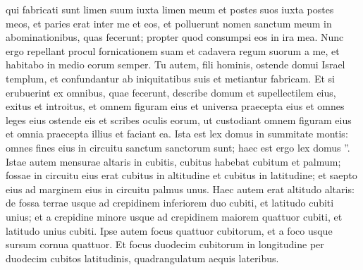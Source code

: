 \begin{biblechapter}
\begin{biblechapter}
\begin{biblechapter}
\begin{biblechapter}
\begin{biblechapter}
\begin{biblechapter}
\begin{biblechapter}
\begin{biblechapter}
\begin{biblechapter}
\begin{biblechapter}
\begin{biblechapter}
\begin{biblechapter}
\begin{biblechapter}
\begin{biblechapter}
\begin{biblechapter}
\begin{biblechapter}
\begin{biblechapter}
\begin{biblechapter}
\begin{biblechapter}
\begin{biblechapter}
\begin{biblechapter}
\begin{biblechapter}
\begin{biblechapter}
\begin{biblechapter}
\begin{biblechapter}
\begin{biblechapter}
\begin{biblechapter}
\begin{biblechapter}
\begin{biblechapter}
\begin{biblechapter}
\begin{biblechapter}
\begin{biblechapter}
\begin{biblechapter}
\begin{biblechapter}
\begin{biblechapter}
\begin{biblechapter}
\begin{biblechapter}
\begin{biblechapter}
\begin{biblechapter}
\begin{biblechapter}
\begin{biblechapter}
\begin{biblechapter}
\begin{biblechapter}
 \verse qui fabricati sunt limen suum iuxta limen meum et postes suos iuxta postes meos, et paries erat inter me et eos, et polluerunt nomen sanctum meum in abominationibus, quas fecerunt; propter quod consumpsi eos in ira mea. 
\verse Nunc ergo repellant procul fornicationem suam et cadavera regum suorum a me, et habitabo in medio eorum semper.
 \verse Tu autem, fili hominis, ostende domui Israel templum, et confundantur ab iniquitatibus suis et metiantur fabricam. 
\verse Et si erubuerint ex omnibus, quae fecerunt, describe domum et supellectilem eius, exitus et introitus, et omnem figuram eius et universa praecepta eius et omnes leges eius ostende eis et scribes oculis eorum, ut custodiant omnem figuram eius et omnia praecepta illius et faciant ea. 
\verse Ista est lex domus in summitate montis: omnes fines eius in circuitu sanctum sanctorum sunt; haec est ergo lex domus ”.
 \verse Istae autem mensurae altaris in cubitis, cubitus habebat cubitum et palmum; fossae in circuitu eius erat cubitus in altitudine et cubitus in latitudine; et saepto eius ad marginem eius in circuitu palmus unus. Haec autem erat altitudo altaris: 
\verse de fossa terrae usque ad crepidinem inferiorem duo cubiti, et latitudo cubiti unius; et a crepidine minore usque ad crepidinem maiorem quattuor cubiti, et latitudo unius cubiti. 
\verse Ipse autem focus quattuor cubitorum, et a foco usque sursum cornua quattuor. 
\verse Et focus duodecim cubitorum in longitudine per duodecim cubitos latitudinis, quadrangulatum aequis lateribus. 

\end{biblechapter}
\end{biblechapter}
\end{biblechapter}
\end{biblechapter}
\end{biblechapter}
\end{biblechapter}
\end{biblechapter}
\end{biblechapter}
\end{biblechapter}
\end{biblechapter}
\end{biblechapter}
\end{biblechapter}
\end{biblechapter}
\end{biblechapter}
\end{biblechapter}
\end{biblechapter}
\end{biblechapter}
\end{biblechapter}
\end{biblechapter}
\end{biblechapter}
\end{biblechapter}
\end{biblechapter}
\end{biblechapter}
\end{biblechapter}
\end{biblechapter}
\end{biblechapter}
\end{biblechapter}
\end{biblechapter}
\end{biblechapter}
\end{biblechapter}
\end{biblechapter}
\end{biblechapter}
\end{biblechapter}
\end{biblechapter}
\end{biblechapter}
\end{biblechapter}
\end{biblechapter}
\end{biblechapter}
\end{biblechapter}
\end{biblechapter}
\end{biblechapter}
\end{biblechapter}
\end{biblechapter}
